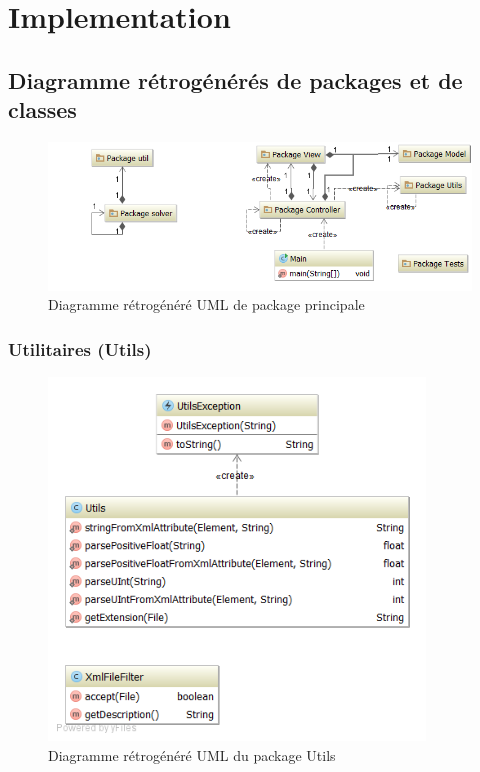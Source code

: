\chapter{Implementation}


\section{Diagramme r\'etrog\'en\'er\'es de packages et de classes}

\begin{figure}[h]
    \centering
    \includegraphics[width=150mm]{../diagrams/classes_packages/final_classes_packages/packages.png}
    \caption{Diagramme r\'etrog\'en\'er\'e UML de package principale}
    \label{diagram:gen_uml_global}
\end{figure}
\pagebreak

\subsection{Utilitaires (Utils)}

\begin{figure}[h]
    \centering
    \includegraphics[width=100mm]{../diagrams/classes_packages/final_classes_packages/utils/package_utils.png}
    \caption{Diagramme r\'etrog\'en\'er\'e UML du package Utils}
    \label{diagram:gen_uml_utils}
\end{figure}
\pagebreak

